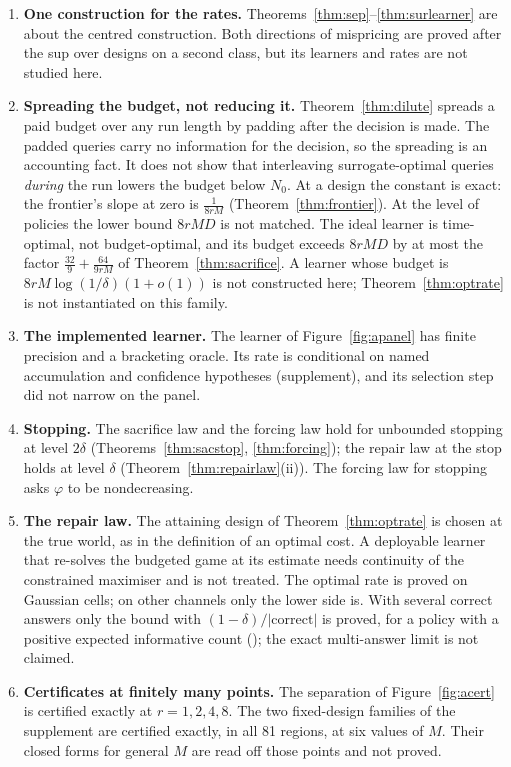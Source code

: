 \begin{enumerate}
\item[1)] \textbf{One construction for the rates.} Theorems~\ref{thm:sep}--\ref{thm:surlearner}
are about the centred construction. Both directions of mispricing are proved after the sup over
designs on a second class, but its learners and rates are not studied here.
\item[2)] \textbf{Spreading the budget, not reducing it.} Theorem~\ref{thm:dilute} spreads a
paid budget over any run length by padding after the decision is made. The padded queries carry
no information for the decision, so the spreading is an accounting fact. It does not show that
interleaving surrogate-optimal queries \emph{during} the run lowers the budget below $N_{0}$.
At a design the constant is exact: the frontier's slope at zero is $\frac{1}{8rM}$
(Theorem~\ref{thm:frontier}). At the level of policies the lower bound $8rMD$ is not matched.
The ideal learner is time-optimal, not budget-optimal, and its budget exceeds $8rMD$ by at most
the factor $\frac{32}{9}+\frac{64}{9rM}$ of Theorem~\ref{thm:sacrifice}. A learner whose budget is
$8rM\log(1/\delta)(1+o(1))$ is not constructed here; Theorem~\ref{thm:optrate} is not
instantiated on this family.
\item[3)] \textbf{The implemented learner.} The learner of Figure~\ref{fig:apanel} has finite
precision and a bracketing oracle. Its rate is conditional on named accumulation and
confidence hypotheses (supplement), and its selection step did not narrow on the panel.
\item[4)] \textbf{Stopping.} The sacrifice law and the forcing law hold for unbounded stopping at
level $2\delta$ (Theorems~\ref{thm:sacstop}, \ref{thm:forcing}); the repair law at the stop holds
at level $\delta$ (Theorem~\ref{thm:repairlaw}(ii)). The forcing law for stopping asks $\varphi$
to be nondecreasing.
\item[5)] \textbf{The repair law.} The attaining design of Theorem~\ref{thm:optrate} is chosen
at the true world, as in the definition of an optimal cost. A deployable learner that re-solves
the budgeted game at its estimate needs continuity of the constrained maximiser and is not
treated. The optimal rate is proved on Gaussian cells; on other channels only the lower side is.
With several correct answers only the bound with $(1-\delta)/|\text{correct}|$ is proved, for a
policy with a positive expected informative count (); the exact
multi-answer limit is not claimed.
\item[6)] \textbf{Certificates at finitely many points.} The separation of
Figure~\ref{fig:acert} is certified exactly at $r=1,2,4,8$. The two fixed-design families of the
supplement are certified exactly, in all 81 regions, at six values of $M$. Their closed forms for
general $M$ are read off those points and not proved.
\end{enumerate}

